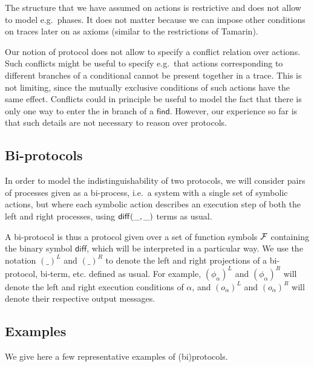 \begin{remark}
  The structure that we have assumed on actions is restrictive and
  does not allow to model e.g.\ phases. It does not matter because we can
  impose other conditions on traces later on as axioms (similar to the
  restrictions of Tamarin).
\end{remark}

\begin{remark}
  Our notion of protocol does not allow to specify a conflict relation
  over actions. Such conflicts might be useful to specify e.g.\ that
  actions corresponding to different branches of a conditional cannot
  be present together in a trace. This is not limiting, since the
  mutually exclusive conditions of such actions have the same effect.
  Conflicts could in principle be useful to model the fact that there is only
  one way to enter the $\mathsf{in}$ branch of a $\mathsf{find}$. However,
  our experience so far is that such details are not necessary to reason
  over protocols.
\end{remark}

\subsection{Bi-protocols}

In order to model the indistinguishability of two protocols, we will
consider pairs of processes given as a bi-process, i.e.\ a system with
a single set of symbolic actions, but where each symbolic action describes
an execution step of both the left and right processes,
using $\mathsf{diff}(\_,\_)$ terms as usual.

A bi-protocol is thus a protocol given over a set of function symbols
$\mathcal{F}$ containing the binary symbol $\mathsf{diff}$,
which will be interpreted in a particular way.
We use the notation $(\_)^L$ and $(\_)^R$ to denote the left and right
projections of a bi-protocol, bi-term, etc. defined as usual.
For example, $(\phi_{\alpha})^L$ and $(\phi_{\alpha})^R$ will denote
the left and right execution conditions of $\alpha$, and
$(o_{\alpha})^L$ and $(o_{\alpha})^R$ will denote their respective
output messages.

\subsection{Examples}

We give here a few representative examples of (bi)protocols.

